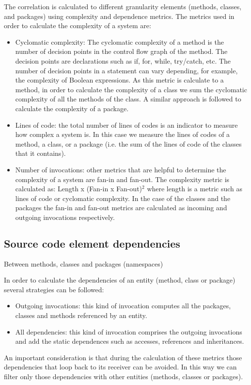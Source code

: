 \documentclass{sig-alternate}
\begin{document}
The correlation is calculated to different granularity elements (methods, classes, and packages) using complexity and dependence metrics. The metrics used in order to calculate the complexity of a system are:
\begin{itemize}%
\item Cyclomatic complexity: The cyclomatic complexity of a method is the number of decision points in the control flow graph of the method. The decision points are declarations such as if, for, while, try/catch, etc. The number of decision points in a statement can vary depending, for example, the complexity of Boolean expressions. As this metric is calculate to a method, in order to calculate the complexity of a class we sum the cyclomatic complexity of all the methods of the class. A similar approach is followed to calculate the complexity of a package. 
\item Lines of code: the total number of lines of codes is an indicator to measure how complex a system is. In this case we measure the lines of codes of a method, a class, or a package (i.e. the sum of the lines of code of the classes that it contains).
\item Number of invocations: other metrics that are helpful to determine the complexity of a system are fan-in and fan-out. The complexity metric is calculated as: Length x (Fan-in x Fan-out)$^{2}$ where length is a metric such as lines of code or cyclomatic complexity. In the case of the classes and the packages the fan-in and fan-out metrics are calculated as incoming and outgoing invocations respectively.
\end{itemize}
\subsection{Source code element dependencies}

Between methods, classes and packages (namespaces)

In order to calculate the dependencies of an entity (method, class or package) several strategies can be followed:
\begin{itemize}
\item Outgoing invocations: this kind of invocation computes all the packages, classes and methods referenced by an entity. 
\item All dependencies: this kind of invocation comprises the outgoing invocations and add the static dependences such as accesses, references and inheritances.
\end{itemize}
An important consideration is that during the calculation of these metrics those dependencies that loop back to its receiver can be avoided. In this way we can filter only those dependencies with other entities (methods, classes or packages).
\end{document}
